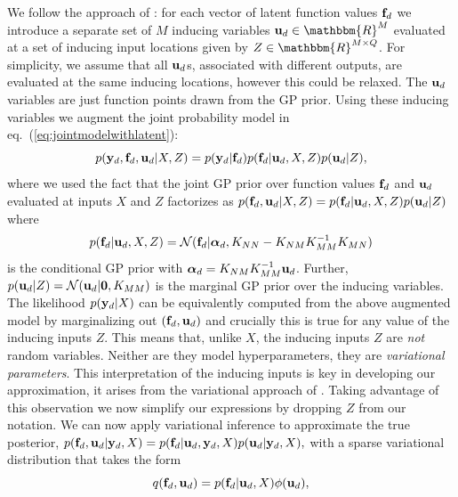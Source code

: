 \documentclass[twoside,times]{article}
\begin{document}
We follow the approach of \citet{Lawrence:larger07}: for each vector
of latent function values $\mathbf{f}_d$ we introduce a separate set of $M$
inducing variables $\bfu_d \in \mathbbm{R}^M$ evaluated at a set of inducing input
locations given by $Z \in \mathbbm{R}^{M \times Q}$. For simplicity, we assume that all $\mathbf{u}_d$s,
associated with different outputs, are evaluated at the same inducing
locations, %
however this could be relaxed. The $\mathbf{u}_d$ variables are just function points drawn from
the GP prior. Using these inducing variables we augment the joint
probability model in eq.\ (\ref{eq:jointmodelwithlatent}):
\begin{equation}
p(\mathbf{y}_d,\mathbf{f}_d,\mathbf{u}_d|X,Z) = p(\mathbf{y}_d|\mathbf{f}_d)
p(\mathbf{f}_d|\mathbf{u}_d, X, Z) p(\mathbf{u}_d | Z), 
\label{eq:jointmodelwithlatentandInd}
\end{equation}      
where we used the fact that the joint GP prior over function values
$\mathbf{f}_d$ and $\mathbf{u}_d$ evaluated at inputs $X$ and $Z$ %
factorizes as $p(\mathbf{f}_d,\mathbf{u}_d|X, Z) = p(\mathbf{f}_d|\mathbf{u}_d, X, Z) p(\mathbf{u}_d
| Z)$ where
$$
p(\mathbf{f}_d|\mathbf{u}_d, X, Z) = \mathcal{N}(\mathbf{f}_d |\boldsymbol{\alpha}_d, 
K_{NN} - K_{NM} K_{MM}^{-1} K_{MN})
$$ 
is the conditional GP prior with $\boldsymbol{\alpha}_d = K_{NM} K_{MM}^{-1} \mathbf{u}_d$. 
Further, $p(\mathbf{u}_d|Z) = \mathcal{N}(\mathbf{u}_d | \mathbf{0}, K_{MM})$ is the
marginal GP prior over the inducing variables. The likelihood $p(\mathbf{y}_d |
X)$ can be equivalently computed from the above augmented model by
marginalizing out $(\mathbf{f}_d, \mathbf{u}_d)$ and crucially this is true for
any value of the inducing inputs $Z$. This means that, unlike $X$, the
inducing inputs $Z$ are \emph{not} random variables. Neither are they
model hyperparameters, %
they are \emph{variational parameters}. This interpretation of the inducing
inputs is key in developing our approximation, it arises from the
variational approach of \citet{Titsias:variational09}.  Taking
advantage of this observation we now simplify our expressions by dropping
$Z$ from our notation. We can now apply variational inference to
approximate the true posterior,
$
p(\mathbf{f}_d,\mathbf{u}_d|\mathbf{y}_d,X) = p(\mathbf{f}_d |\mathbf{u}_d, \mathbf{y}_d, X) p(\mathbf{u}_d|\mathbf{y}_d, X), 
$
with a sparse variational distribution that takes the form  
\begin{equation}
q(\mathbf{f}_d,\mathbf{u}_d) =  p(\mathbf{f}_d|\mathbf{u}_d,X) \phi(\mathbf{u}_d),
\end{equation} 
\end{document}
